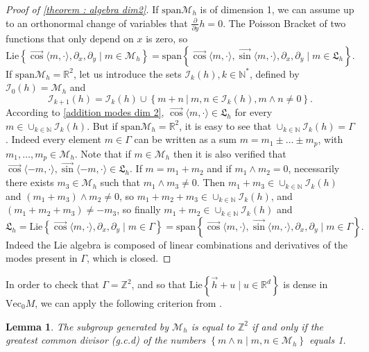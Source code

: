\documentclass[10pt]{article}
\newcommand{\p}{\partial}
\newcommand{\R}{{\mathbb R}}
\newcommand{\N}{{\mathbb N}}
\newcommand{\Z}{{\mathbb Z}}
\newcommand{\M}{{\mathcal M}}
\newcommand{\la}{\langle}
\newcommand{\ra}{\rangle}
\newcommand{\f}{\overrightarrow}
\newcommand{\we}{\wedge}
\newtheorem{lemma}{Lemma}
\begin{document}
\begin{proof}[Proof of \cref{theorem : algebra dim2}]
If $\mathrm{span} \M_h$ is of dimension 1, we can assume up to an orthonormal change of variables that $\frac{\p}{\p y}h=0$. The Poisson Bracket of two functions that only depend on $x$ is zero, so 
\begin{equation*}
    \mathrm{Lie}\left\{ \f{\cos}\la m,\cdot \ra,\p_x,\p_y \mid m \in \M_h\right\}=\mathrm{span} \left\{\f{\cos}\la m,\cdot \ra, \f{\sin}\la m,\cdot \ra,\p_x, \p_y \mid m \in \mathfrak{L}_h \right\}.
\end{equation*}
If $\mathrm{span}\M_h=\R^2$, let us introduce the sets $\mathcal{I}_k(h),k \in \N^{*}$, defined by $\mathcal{I}_0(h)=\M_h$ and 
\begin{equation*}
    \mathcal{I}_{k+1}(h)=\mathcal{I}_k(h) \cup \left\{m+n \: | \: m,n \in \mathcal{I}_k(h), m \we n \neq 0\right\}.
\end{equation*}
According to \cref{addition modes dim 2}, $\f{\cos}\la m, \cdot \ra \in \mathfrak{L}_h$ for every $m \in \cup_{k \in \N}\mathcal{I}_k(h)$. But if $\mathrm{span} \M_h=\R^2$, it is easy to see that $\cup_{k \in \N}\mathcal{I}_k(h)=\Gamma$. Indeed every element $m \in \Gamma$ can be written as a sum $m=m_1\pm\dots \pm m_p$, with $m_1,\dots, m_p\in \M_h$. Note that if $m \in \M_h$ then it is also verified that $\f{\cos}\la -m, \cdot \ra,\f{\sin}\la -m,\cdot \ra \in \mathfrak{L}_h$. If $m=m_1 +m_2$ and if $m_1 \we m_2=0$, necessarily there exists $m_3\in \M_h$ such that $m_1 \we m_3 \neq 0$. Then $m_1+m_3\in \cup_{k \in \N}\mathcal{I}_k(h)$ and $(m_1 + m_3)\we m_2 \neq 0$, so $m_1+m_2+m_3 \in \cup_{k \in \N}\mathcal{I}_k(h)$, and $(m_1+m_2+m_3)\neq -m_3$, so finally $m_1+m_2 \in \cup_{k \in \N}\mathcal{I}_k(h)$ and 
\begin{equation*}
    \mathfrak{L}_h=\mathrm{Lie} \left\{ \f{\cos}\la m, \cdot \ra, \p_x,\p_y \mid m \in \Gamma\right\}=\mathrm{span} \left\{\f{\cos}\la m, \cdot \ra, \f{\sin}\la m, \cdot \ra,\p_x, \p_y \mid m \in \Gamma \right\}.
\end{equation*}
Indeed the Lie algebra is composed of linear combinations and derivatives of the modes present in $\Gamma$, which is closed. 
\end{proof}

In order to check that $\Gamma=\Z^2$, and so that $\mathrm{Lie}\left\{\f{h}+u \mid u \in \R^d\right\}$ is dense in $\mathrm{Vec}_0M$, we can apply the following criterion from \cite[Lem. 1]{AgSa05}.

\begin{lemma}
    The subgroup generated by $\M_h$ is equal to $\Z^2$ if and only if the greatest common divisor (g.c.d) of the numbers $\left\{ m \we n \mid m,n \in \M_h\right\}$ equals 1.
\end{lemma}
\end{document}
